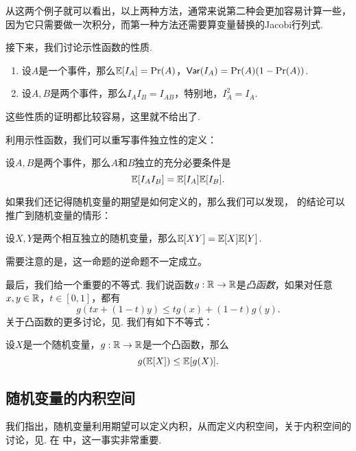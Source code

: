 从这两个例子就可以看出，以上两种方法，通常来说第二种会更加容易计算一些，因为它只需要做一次积分，而第一种方法还需要算变量替换的Jacobi行列式. 

接下来，我们讨论示性函数的性质. 

\begin{proposition}\label{prop:expectation-indicator}
\begin{enumerate}
    \item 设$A$是一个事件，那么$\mathbb{E}[I_A]=\Pr(A)$，$\mathsf{Var}(I_A)=\Pr(A)(1-\Pr(A))$.
    \item 设$A,B$是两个事件，那么$I_AI_B=I_{AB}$，特别地，$I_A^2=I_A$.
\end{enumerate}
\end{proposition}
这些性质的证明都比较容易，这里就不给出了. 

利用示性函数，我们可以重写事件独立性的定义：

\begin{proposition}\label{prop:independent-expectation}
设$A,B$是两个事件，那么$A$和$B$独立的充分必要条件是
\[\mathbb{E}[I_AI_B]=\mathbb{E}[I_A]\mathbb{E}[I_B].\]
\end{proposition}

如果我们还记得随机变量的期望是如何定义的，那么我们可以发现， 的结论可以推广到随机变量的情形：

\begin{proposition}\label{prop:independent-expectation-2}
设$X,Y$是两个相互独立的随机变量，那么$\mathbb{E}[XY]=\mathbb{E}[X]\mathbb{E}[Y]$. 
\end{proposition}

需要注意的是，这一命题的逆命题不一定成立。

最后，我们给一个重要的不等式. 我们说函数$g:\mathbb{R}\to\mathbb{R}$是\emph{凸函数}，如果对任意$x,y\in\mathbb{R}$，$t\in[0,1]$，都有
\[g(tx+(1-t)y)\leq tg(x)+(1-t)g(y).\]
关于凸函数的更多讨论，见. 我们有如下不等式：

\begin{proposition}[Jensen不等式]\label{prop:jensen}
设$X$是一个随机变量，$g:\mathbb{R}\to\mathbb{R}$是一个凸函数，那么
\[g(\mathbb{E}[X])\leq \mathbb{E}[g(X)].\]
\end{proposition}

\subsection{随机变量的内积空间}\label{subsec:inner-product}

我们指出，随机变量利用期望可以定义内积，从而定义内积空间，关于内积空间的讨论，见. 在 中，这一事实非常重要. 


